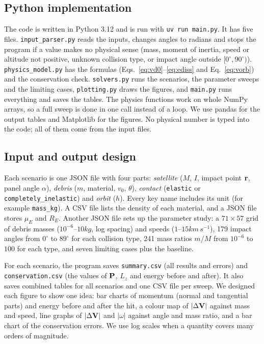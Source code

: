 \subsection{Python implementation}

The code is written in Python 3.12 and is run with
\texttt{uv run main.py}. It has five files.
\texttt{input\_parser.py} reads the inputs, changes angles to radians and
stops the program if a value makes no physical sense (mass, moment of
inertia, speed or altitude not positive, unknown collision type, or impact
angle outside $[0^\circ,90^\circ)$). \texttt{physics\_model.py} has the
formulas (Eqs.~\eqref{eq:vd0}--\eqref{eq:ediss} and Eq.~\eqref{eq:vorb})
and the conservation check. \texttt{solvers.py} runs the scenarios, the
parameter sweeps and the limiting cases, \texttt{plotting.py} draws the
figures, and \texttt{main.py} runs everything and saves the tables. The physics functions work on whole NumPy arrays,
so a full sweep is done in one call instead of a loop. We use pandas for
the output tables and Matplotlib for the figures. No physical number is
typed into the code; all of them come from the input files.

\subsection{Input and output design}

Each scenario is one JSON file with four parts: \textit{satellite} ($M$,
$I$, impact point $\mathbf{r}$, panel angle $\alpha$), \textit{debris} ($m$,
material, $v_0$, $\theta$), \textit{contact} (\texttt{elastic} or
\texttt{completely\_inelastic}) and \textit{orbit} ($h$). Every key name
includes its unit (for example \texttt{mass\_kg}). A CSV file lists the
density of each material, and a JSON file stores $\mu_E$ and $R_E$.
Another JSON file sets up the parameter study: a $71\times57$ grid of
debris masses ($10^{-6}$--$10\unit{kg}$, log spacing) and speeds
($1$--$15\unit{km\,s^{-1}}$), 179 impact angles from $0^\circ$ to
$89^\circ$ for each collision type, 241 mass ratios $m/M$ from $10^{-6}$
to $100$ for each type, and seven limiting cases plus the baseline.

For each scenario, the program saves \texttt{summary.csv} (all results
and errors) and \texttt{conservation.csv} (the values of $\mathbf{P}$, $L_z$
and energy before and after). It also saves combined tables for all
scenarios and one CSV file per sweep. We designed each figure to show one
idea: bar charts of momentum (normal and tangential parts) and energy
before and after the hit, a colour map of $|\Delta\mathbf{V}|$ against mass
and speed, line graphs of $|\Delta\mathbf{V}|$ and $|\omega|$ against angle
and mass ratio, and a bar chart of the conservation errors. We use log
scales when a quantity covers many orders of magnitude.

